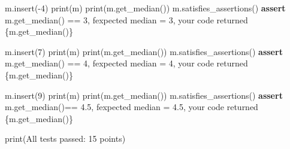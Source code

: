 \documentclass[
]{article}
\newenvironment{Shaded}{}{}
\newcommand{\BuiltInTok}[1]{\textcolor[rgb]{0.00,0.50,0.00}{#1}}
\newcommand{\ControlFlowTok}[1]{\textcolor[rgb]{0.00,0.44,0.13}{\textbf{#1}}}
\newcommand{\DecValTok}[1]{\textcolor[rgb]{0.25,0.63,0.44}{#1}}
\newcommand{\FloatTok}[1]{\textcolor[rgb]{0.25,0.63,0.44}{#1}}
\newcommand{\NormalTok}[1]{#1}
\newcommand{\OperatorTok}[1]{\textcolor[rgb]{0.40,0.40,0.40}{#1}}
\newcommand{\SpecialCharTok}[1]{\textcolor[rgb]{0.25,0.44,0.63}{#1}}
\newcommand{\SpecialStringTok}[1]{\textcolor[rgb]{0.73,0.40,0.53}{#1}}
\newcommand{\StringTok}[1]{\textcolor[rgb]{0.25,0.44,0.63}{#1}}
\begin{document}
\begin{Shaded}
\begin{Highlighting}[]
\NormalTok{m.insert(}\OperatorTok{{-}}\DecValTok{4}\NormalTok{)}
\BuiltInTok{print}\NormalTok{(m)}
\BuiltInTok{print}\NormalTok{(m.get\_median())}
\NormalTok{m.satisfies\_assertions()}
\ControlFlowTok{assert}\NormalTok{ m.get\_median() }\OperatorTok{==} \DecValTok{3}\NormalTok{,  }\SpecialStringTok{f\textquotesingle{}expected median = 3, your code returned }\SpecialCharTok{\{}\NormalTok{m}\SpecialCharTok{.}\NormalTok{get\_median()}\SpecialCharTok{\}}\SpecialStringTok{\textquotesingle{}}

\NormalTok{m.insert(}\DecValTok{7}\NormalTok{)}
\BuiltInTok{print}\NormalTok{(m)}
\BuiltInTok{print}\NormalTok{(m.get\_median())}
\NormalTok{m.satisfies\_assertions()}
\ControlFlowTok{assert}\NormalTok{ m.get\_median() }\OperatorTok{==} \DecValTok{4}\NormalTok{, }\SpecialStringTok{f\textquotesingle{}expected median = 4, your code returned }\SpecialCharTok{\{}\NormalTok{m}\SpecialCharTok{.}\NormalTok{get\_median()}\SpecialCharTok{\}}\SpecialStringTok{\textquotesingle{}}

\NormalTok{m.insert(}\DecValTok{9}\NormalTok{)}
\BuiltInTok{print}\NormalTok{(m)}
\BuiltInTok{print}\NormalTok{(m.get\_median())}
\NormalTok{m.satisfies\_assertions()}
\ControlFlowTok{assert}\NormalTok{ m.get\_median()}\OperatorTok{==} \FloatTok{4.5}\NormalTok{, }\SpecialStringTok{f\textquotesingle{}expected median = 4.5, your code returned }\SpecialCharTok{\{}\NormalTok{m}\SpecialCharTok{.}\NormalTok{get\_median()}\SpecialCharTok{\}}\SpecialStringTok{\textquotesingle{}}

\BuiltInTok{print}\NormalTok{(}\StringTok{\textquotesingle{}All tests passed: 15 points\textquotesingle{}}\NormalTok{)}
\end{Highlighting}
\end{Shaded}
\end{document}
